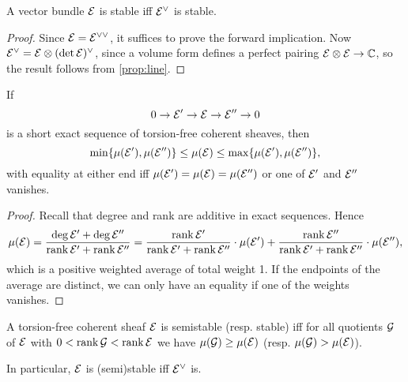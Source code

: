 \begin{proposition}\label{prop:stable dual}
    A vector bundle $\mathcal{E}$ is stable iff $\mathcal{E}^\vee$ is stable.
\end{proposition}

\begin{proof}
    Since $\mathcal{E}=\mathcal{E}^{\vee\vee}$, it suffices to prove the forward
    implication. Now $\mathcal{E}^\vee=\mathcal{E}\otimes(\det\mathcal{E})^\vee$, since a volume
    form defines a perfect pairing $\mathcal{E}\otimes\mathcal{E}\to\mathbb{C}$, so the result
    follows from \cref{prop:line}.
\end{proof}

\begin{proposition}\label{prop:slope SES}
    If
    \begin{equation*}
        0\to\mathcal{E}'\to\mathcal{E}\to\mathcal{E}''\to0
    \end{equation*}
    is a short exact sequence of torsion-free coherent sheaves, then
    \begin{equation*}
        \min\{\mu(\mathcal{E}'),\mu(\mathcal{E}'')\}
            \le \mu(\mathcal{E}) \le \max\{\mu(\mathcal{E}'),\mu(\mathcal{E}'')\},
    \end{equation*}
    with equality at either end iff $\mu(\mathcal{E}')=\mu(\mathcal{E})=\mu(\mathcal{E}'')$ or one
    of $\mathcal{E}'$ and $\mathcal{E}''$ vanishes.
\end{proposition}

\begin{proof}
    Recall that degree and rank are additive in exact sequences. Hence
    \begin{align*}
        \mu(\mathcal{E})
            = \frac{\deg\mathcal{E}'+\deg\mathcal{E}''}{\operatorname{rank}\mathcal{E}'+\operatorname{rank}\mathcal{E}''}
            = \frac{\operatorname{rank}\mathcal{E}'}{\operatorname{rank}\mathcal{E}'+\operatorname{rank}\mathcal{E}''}\cdot\mu(\mathcal{E}')
            + \frac{\operatorname{rank}\mathcal{E}''}{\operatorname{rank}\mathcal{E}'+\operatorname{rank}\mathcal{E}''}\cdot\mu(\mathcal{E}''),
    \end{align*}
    which is a positive weighted average of total weight 1. If the endpoints of
    the average are distinct, we can only have an equality if one of the weights
    vanishes.
\end{proof}

\begin{proposition}\label{prop:duality}
    A torsion-free coherent sheaf $\mathcal{E}$ is semistable (resp. stable) iff for
    all quotients $\mathcal{G}$ of $\mathcal{E}$ with $0<\operatorname{rank}\mathcal{G}<\operatorname{rank}\mathcal{E}$ we have
    $\mu(\mathcal{G})\ge\mu(\mathcal{E})$ (resp. $\mu(\mathcal{G})>\mu(\mathcal{E})$).

    In particular, $\mathcal{E}$ is (semi)stable iff $\mathcal{E}^\vee$ is.
\end{proposition}

